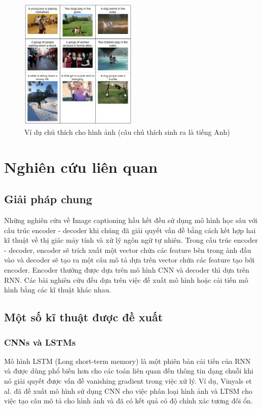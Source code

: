 \documentclass[conference]{IEEEtran}
\begin{document}
\begin{figure}[h]
\includegraphics[width=0.5\textwidth]{assets/example.jpg}
  \caption{Ví dụ chú thích cho hình ảnh (câu chú thích sinh ra là tiếng Anh)}
  \label{fig:example}
\end{figure}

\section{Nghiên cứu liên quan}
\subsection{Giải pháp chung}
Những nghiên cứu về Image captioning hầu hết đều sử dụng mô hình học sâu với cấu trúc encoder - decoder khi chúng đã giải quyết vấn đề bằng cách kết hợp hai kĩ thuật về thị giác máy tính và xử lý ngôn ngữ tự nhiên.
Trong cấu trúc encoder - decoder, encoder sẽ trích xuất một vector chứa các feature bên trong ảnh đầu vào và decoder sẽ tạo ra một câu mô tả dựa trên vector chứa các feature tạo bởi encoder.
Encoder thường được dựa trên mô hình CNN và decoder thì dựa trên RNN. Các bài nghiên cứu đều dựa trên việc đề xuất mô hình hoặc cải tiến mô hình bằng các kĩ thuật khác nhau. 

\subsection{Một số kĩ thuật được đề xuất}
\subsubsection{CNNs và LSTMs} 
Mô hình LSTM (Long short-term memory) \cite{hochreiter1997long} là một phiên bản cải tiến của RNN và được dùng phổ biến hơn cho các toán liên quan đến thông tin dạng chuỗi khi nó giải quyết được vấn đề vanishing gradient trong việc xử lý. Ví dụ, Vinyals et al. đã đề xuất mô hình sử dụng CNN cho việc phân loại hình ảnh và LTSM cho việc tạo câu mô tả cho hình ảnh \cite{vinyals2015show} và đã có kết quả có độ chính xác tương đối ổn.
\end{document}

